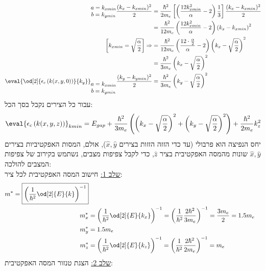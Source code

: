 \documentclass{article}
\begin{document}
\begin{Answer}
\begin{align*}
{\begin{matrix}
        a=k_{xmin}\\
        b=k_{ymin}
    \end{matrix}}\frac{(k_{x}-k_{xmin})^2}{2}&=\frac{\hbar^2}{2m_{e}}\left[ \left( \frac{12k_{xmin}^2}{\alpha}-2\right)\frac{1}{3}\right]\frac{(k_{x}-k_{xmin})^2}{2}\\
    &=\frac{\hbar^{2}}{12m_{e}} \left( \frac{12k_{xmin}^2}{\alpha}-2\right)\left( k_{x}-k_{xmin} \right)^{2}\\
    \left[ k_{xmin}=\sqrt{\frac{\alpha}{2}} \right]\Rightarrow &=\frac{\hbar^{2}}{12m_{e}} \left( \frac{12\cdot\frac{\alpha}{2}}{\alpha}-2\right)\left( k_{x}-\sqrt{\frac{\alpha}{2}} \right)^{2}\\
    &=\frac{\hbar^{2}}{3m_{e}}\left( k_{x}-\sqrt{\frac{\alpha}{2}} \right)^{2}\\
    \eval{\od[2]{\epsilon_{c}\left(k(x,y,0)\right)}{k_{y}}}_{\begin{matrix}
        a=k_{xmin}\\
        b=k_{ymin}
    \end{matrix}}\frac{(k_{y}-k_{ymin})^2}{2}&=\frac{\hbar^{2}}{3m_{e}}\left( k_{y}-\sqrt{\frac{\alpha}{2}} \right)^{2}
\end{align*}
עבור כל הצירים נקבל בסך הכל:
\begin{align*}
    \eval{\epsilon_{c}\left( k(x,y,z) \right)}_{kmin}=E_{gap}+\frac{\hbar^{2}}{3m_{e}}\left( \left( k_{x}-\sqrt{\frac{\alpha}{2}} \right)^{2}+\left( k_{y}-\sqrt{\frac{\alpha}{2}} \right)^{2} \right)+\frac{\hbar^{2}}{2m_{e}}k_{z}^{2}
\end{align*}
יחס הנפיצה הוא פרבולי (עד כדי הזזה הזזות בצירים $\hat{x},\hat{y}$), אולם, המסות האפקטיביות בצירים $\hat{x},\hat{y}$ שונות מהמסה האפקטיבית בציר $\hat{z}$, כדי לקבל צפיפות מצבים, נשתמש בקירוב של צפיפות המצבים להולכה:\\
\underline{שלב 1:} חישוב המסה האפקטיבית לכל ציר:
\begin{align*}
    m^{*}=\boxed{\left( \frac{1}{\hbar^{2}} \od[2]{E}{k} \right)^{-1}}\\
    m_{x}^{*}&=\left( \frac{1}{\hbar^{2}} \od[2]{E}{k_{x}} \right)^{-1}=\left( \frac{1}{\hbar^{2}} \frac{2\hbar^{2}}{3m_{e}} \right)^{-1}=\frac{3m_{e}}{2}=1.5m_{e}\\
    m_{y}^{*}&=1.5m_{e}\\
    m_{z}^{*}&=\left( \frac{1}{\hbar^{2}} \od[2]{E}{k_{z}} \right)^{-1}=\left( \frac{1}{\hbar^{2}} \frac{2\hbar^{2}}{2m_{e}} \right)^{-1}=m_{e}
\end{align*}
\underline{שלב 2:} הצגת טנזור המסה האפקטיבית:

\end{Answer}
\end{document}
